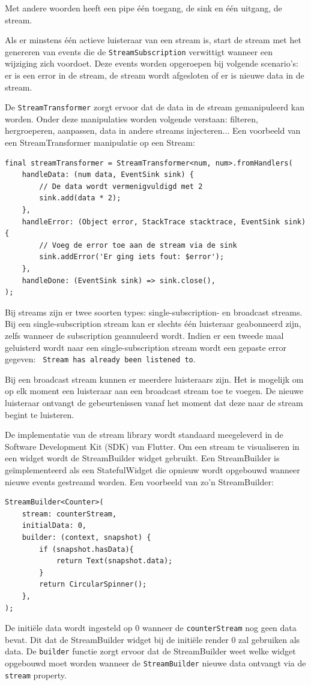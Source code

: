 Met andere woorden heeft een pipe één toegang, de sink en één uitgang, de stream.

Als er minstens één actieve luisteraar van een stream is, start de stream met het genereren van events die de \verb|StreamSubscription| verwittigt wanneer een wijziging zich voordoet. Deze events worden opgeroepen bij volgende scenario's: er is een error in de stream, de stream wordt afgesloten of er is nieuwe data in de stream.

De \verb|StreamTransformer| zorgt ervoor dat de data in de stream gemanipuleerd kan worden. Onder deze manipulaties worden volgende verstaan: filteren, hergroeperen, aanpassen, data in andere streams injecteren...
Een voorbeeld van een StreamTransformer manipulatie op een Stream:
 \begin{verbatim}
final streamTransformer = StreamTransformer<num, num>.fromHandlers(
    handleData: (num data, EventSink sink) {
        // De data wordt vermenigvuldigd met 2
        sink.add(data * 2);
    }, 
    handleError: (Object error, StackTrace stacktrace, EventSink sink) {
        // Voeg de error toe aan de stream via de sink
        sink.addError('Er ging iets fout: $error');
    }, 
    handleDone: (EventSink sink) => sink.close(),
);
\end{verbatim}

Bij streams zijn er twee soorten types: single-subscription- en broadcast streams. Bij een single-subscription stream kan er slechts één luisteraar geabonneerd zijn, zelfs wanneer de subscription geannuleerd wordt. Indien er een tweede maal geluisterd wordt naar een single-subscription stream wordt een gepaste error gegeven: \verb| Stream has already been listened to|.

Bij een broadcast stream kunnen er meerdere luisteraars zijn. Het is mogelijk om op elk moment een luisteraar aan een broadcast stream toe te voegen. De nieuwe luisteraar ontvangt de gebeurtenissen vanaf het moment dat deze naar de stream begint te luisteren.

De implementatie van de stream library wordt standaard meegeleverd in de Software Development Kit (SDK) van Flutter. Om een stream te visualiseren in een widget wordt de StreamBuilder widget gebruikt. Een StreamBuilder is geïmplementeerd als een StatefulWidget die opnieuw wordt opgebouwd wanneer nieuwe events gestreamd worden.
Een voorbeeld van zo'n StreamBuilder:
\begin{verbatim}
StreamBuilder<Counter>(
    stream: counterStream,
    initialData: 0,
    builder: (context, snapshot) {
        if (snapshot.hasData){
            return Text(snapshot.data);
        }
        return CircularSpinner();
    },
);
\end{verbatim}
De initiële data wordt ingesteld op 0 wanneer de \verb|counterStream| nog geen data bevat. Dit dat de StreamBuilder widget bij de initiële render 0 zal gebruiken als data. De \verb|builder| functie zorgt ervoor dat de StreamBuilder weet welke widget opgebouwd moet worden wanneer de \verb|StreamBuilder| nieuwe data ontvangt via de \verb|stream| property.

